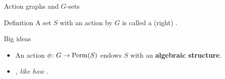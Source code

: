 \documentclass[8pt,handout]{beamer}
\newcommand{\Pause}{}      %
\begin{document}
\begin{frame}{Action graphs and $G$-sets}
  
  \begin{block}{Definition}
    A set $S$ with an action by $G$ is called a (right)
    .
  \end{block}
  
  \begin{alertblock}{Big ideas}
   \begin{itemize}
    \item An action $\phi\colon G\to\operatorname{Perm}(S)$ endows $S$ with an
      \textbf{algebraic structure}.
    \item \emph{, like how
      .}
    \end{itemize}
  \end{alertblock}

  \vspace{-3mm}


\end{frame}
\end{document}
